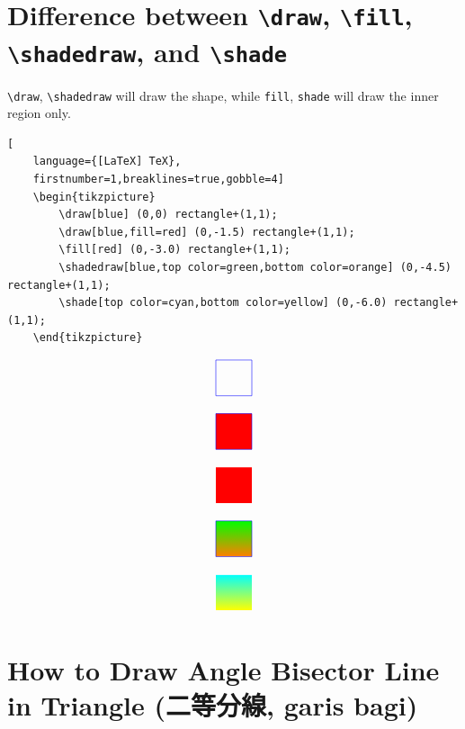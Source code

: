 \documentclass[lualatex]{jlreq}
\begin{document}
\cprotect \section{Difference between \verb|\draw|, \verb|\fill|, \verb|\shadedraw|, and \verb|\shade|} %

\verb|\draw|, \verb|\shadedraw| will draw the shape, while \verb|fill|, \verb|shade| will draw the inner region only.
\begin{lstlisting}[
    language={[LaTeX] TeX},
    firstnumber=1,breaklines=true,gobble=4]
    \begin{tikzpicture}
        \draw[blue] (0,0) rectangle+(1,1);
        \draw[blue,fill=red] (0,-1.5) rectangle+(1,1);
        \fill[red] (0,-3.0) rectangle+(1,1);
        \shadedraw[blue,top color=green,bottom color=orange] (0,-4.5) rectangle+(1,1);
        \shade[top color=cyan,bottom color=yellow] (0,-6.0) rectangle+(1,1);
    \end{tikzpicture}
\end{lstlisting}
\[
    \begin{tikzpicture}
        \draw[blue] (0,0) rectangle+(1,1);
        \draw[blue,fill=red] (0,-1.5) rectangle+(1,1);
        \fill[red] (0,-3.0) rectangle+(1,1);
        \shadedraw[blue,top color=green,bottom color=orange] (0,-4.5) rectangle+(1,1);
        \shade[top color=cyan,bottom color=yellow] (0,-6.0) rectangle+(1,1);
    \end{tikzpicture}
\]

\section{How to Draw Angle Bisector Line in Triangle (二等分線, garis bagi)}
\label{sec:anglebisector}
\end{document}

